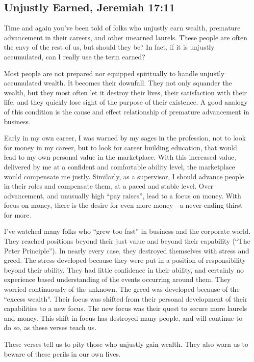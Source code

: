 \documentclass[12pt]{memoir}
\begin{document}
\subsection{Unjustly Earned, Jeremiah 17:11}

Time and again you've been told of folks who unjustly earn wealth,
premature advancement in their careers, and other unearned laurels.
These people are often the envy of the rest of us, but should they
be? In fact, if it is unjustly accumulated, can I really use the term
earned?

Most people are not prepared nor equipped spiritually to handle unjustly
accumulated wealth. It becomes their downfall. They not only squander
the wealth, but they most often let it destroy their lives, their
satisfaction with their life, and they quickly lose sight of the purpose
of their existence. A good analogy of this condition is the cause
and effect relationship of premature advancement in business.

Early in my own career, I was warned by my sages in the profession,
not to look for money in my career, but to look for career building
education, that would lead to my own personal value in the marketplace.
With this increased value, delivered by me at a confident and comfortable
ability level, the marketplace would compensate me justly. Similarly,
as a supervisor, I should advance people in their roles and compensate
them, at a paced and stable level. Over advancement, and unusually
high ``pay raises'', lead to a focus on money. With focus on money,
there is the desire for even more money---a never-ending thirst for
more.

I've watched many folks who ``grew too fast'' in business and the
corporate world. They reached positions beyond their just value and
beyond their capability (``The Peter Principle''). In nearly every
case, they destroyed themselves with stress and greed. The stress
developed because they were put in a position of responsibility beyond
their ability. They had little confidence in their ability, and certainly
no experience based understanding of the events occurring around them.
They worried continuously of the unknown. The greed was developed
because of the ``excess wealth''. Their focus was shifted from their
personal development of their capabilities to a new focus. The new
focus was their quest to secure more laurels and money. This shift
in focus has destroyed many people, and will continue to do so, as
these verses teach us.

These verses tell us to pity those who unjustly gain wealth. They
also warn us to beware of these perils in our own lives.
\end{document}
